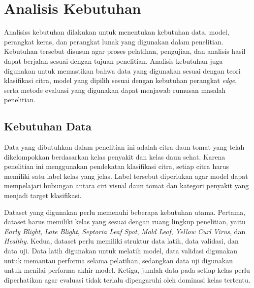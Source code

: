 \section{Analisis Kebutuhan}
\begin{sectioncontent}
    \hspace{\parindent}Analisiss kebutuhan dilakukan untuk menentukan kebutuhan data, model, perangkat keras, dan perangkat lunak yang digunakan dalam penelitian. Kebutuhan tersebut disusun agar proses pelatihan, pengujian, dan analisis hasil dapat berjalan sesuai dengan tujuan penelitian. Analisis kebutuhan juga digunakan untuk memastikan bahwa data yang digunakan sesuai dengan teori klasifikasi citra, model yang dipilih sesuai dengan kebutuhan perangkat \textit{edge}, serta metode evaluasi yang digunakan dapat menjawab rumusan masalah penelitian.

    \subsection{Kebutuhan Data}
    \begin{subsectioncontent}
        \hspace{\parindent}Data yang dibutuhkan dalam penelitian ini adalah citra daun tomat yang telah dikelompokkan berdasarkan kelas penyakit dan kelas daun sehat. Karena penelitian ini menggunakan pendekatan klasifikasi citra, setiap citra harus memiliki satu label kelas yang jelas. Label tersebut diperlukan agar model dapat mempelajari hubungan antara ciri visual daun tomat dan kategori penyakit yang menjadi target klasifikasi.

        Dataset yang digunakan perlu memenuhi beberapa kebutuhan utama. Pertama, dataset harus memiliki kelas yang sesuai dengan ruang lingkup penelitian, yaitu \textit{Early Blight}, \textit{Late Blight}, \textit{Septoria Leaf Spot}, \textit{Mold Leaf}, \textit{Yellow Curl Virus}, dan \textit{Healthy}. Kedua, dataset perlu memiliki struktur data latih, data validasi, dan data uji. Data latih digunakan untuk melatih model, data validasi digunakan untuk memantau performa selama pelatihan, sedangkan data uji digunakan untuk menilai performa akhir model. Ketiga, jumlah data pada setiap kelas perlu diperhatikan agar evaluasi tidak terlalu dipengaruhi oleh dominasi kelas tertentu.


\end{subsectioncontent}
\end{sectioncontent}

